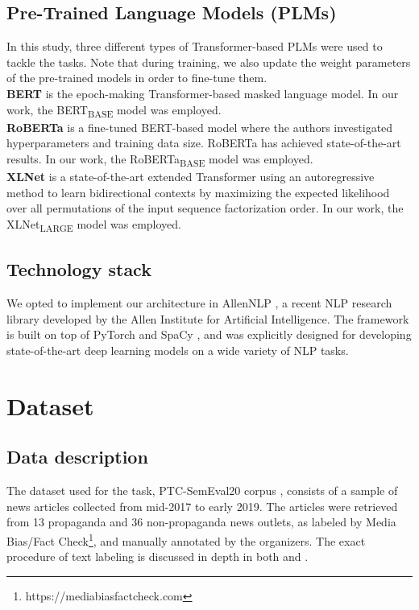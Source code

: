 \documentclass[11pt]{article}
\newcommand{\pol}[1]{{\fontfamily{pcr}\selectfont#1}}
\begin{document}
\subsection{Pre-Trained Language Models (\pol{PLMs})}
In this study, three different types of Transformer-based \pol{PLM}s \cite{vaswani2017attention} were used to tackle the tasks. Note that during training, we also update the weight parameters of the pre-trained models in order to fine-tune them. \\
\textbf{\pol{BERT}} \cite{devlin2019bert} is the epoch-making Transformer-based masked language model. In our work, the \pol{BERT\textsubscript{BASE}} model was employed. \\
\textbf{\pol{RoBERTa}} \cite{roberta} is a fine-tuned \pol{BERT}-based model where the authors investigated hyperparameters and training data size. \pol{RoBERTa} has achieved state-of-the-art results. In our work, the \pol{RoBERTa\textsubscript{BASE}} model was employed. \\
\textbf{\pol{XLNet}} \cite{yang2020xlnet} is a state-of-the-art extended Transformer using an autoregressive method to learn bidirectional contexts by maximizing the expected likelihood over all permutations of the input sequence factorization order. In our work, the \pol{XLNet\textsubscript{LARGE}} model was employed.

\subsection{Technology stack}
We opted to implement our architecture in \pol{AllenNLP} \cite{allennlp}, a recent NLP research library developed by the Allen Institute for Artificial Intelligence. The framework is built on top of PyTorch \cite{NEURIPS2019_9015} and SpaCy \cite{spacy2}, and was explicitly designed for developing state-of-the-art deep learning models on a wide variety of NLP tasks. 

\section{Dataset}
\subsection{Data description}
The dataset used for the task, PTC-SemEval20 corpus \cite{semeval}, consists of a sample of news articles collected from mid-2017 to early 2019. The articles were retrieved from 13 propaganda and 36 non-propaganda news outlets, as labeled by Media Bias/Fact Check\footnote{https://mediabiasfactcheck.com}, and manually annotated by the organizers. The exact procedure of text labeling is discussed in depth in both \cite{da-san-martino-etal-2019-fine} and \cite{semeval}. 
\end{document}
